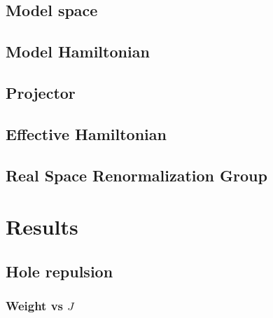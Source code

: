 \documentclass[12pt,twoside]{report}
\begin{document}
	\section{Model space}
	
	\section{Model Hamiltonian}
	
	\section{Projector}
	
	\section{Effective Hamiltonian}
	
	\section{Real Space Renormalization Group}
	
	\chapter{Results}
	
	\section{Hole repulsion}
	
	
	\subsection{Weight vs $J$}
\end{document}
